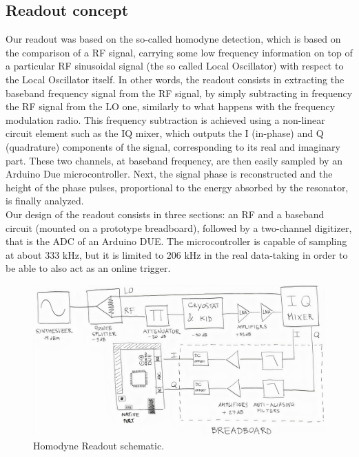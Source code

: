 \documentclass[12pt]{article}
\begin{document}
\subsection{Readout concept}
Our readout was based on the so-called homodyne detection, which is based on the comparison of a RF signal, carrying some low frequency information on top of a particular RF sinusoidal signal (the so called Local Oscillator) with respect to the Local Oscillator itself.
In other words, the readout consists in extracting the baseband frequency signal from the RF signal, by simply subtracting in frequency the RF signal from the LO one, similarly to what happens with the frequency modulation radio. This frequency subtraction is achieved using a non-linear circuit element such as the IQ mixer, which outputs the I (in-phase) and Q (quadrature) components of the signal, corresponding to its real and imaginary part. These two channels, at baseband frequency, are then easily sampled by an Arduino Due microcontroller. Next, the signal phase is reconstructed and the height of the phase pulses, proportional to the energy absorbed by the resonator, is finally analyzed.\\
Our design of the readout consists in three sections: an RF and a baseband circuit (mounted on a prototype breadboard), followed by a two-channel digitizer, that is the ADC of an Arduino DUE. The microcontroller is capable of sampling at about 333 kHz, but it is limited to 206 kHz in the real data-taking in order to be able to also act as an online trigger.
\begin{figure}[H]
        \centering
        \includegraphics[width=\textwidth]{schema.jpg}
        \caption{Homodyne Readout schematic.}
        \label{scheme}
    \end{figure}
\end{document}
